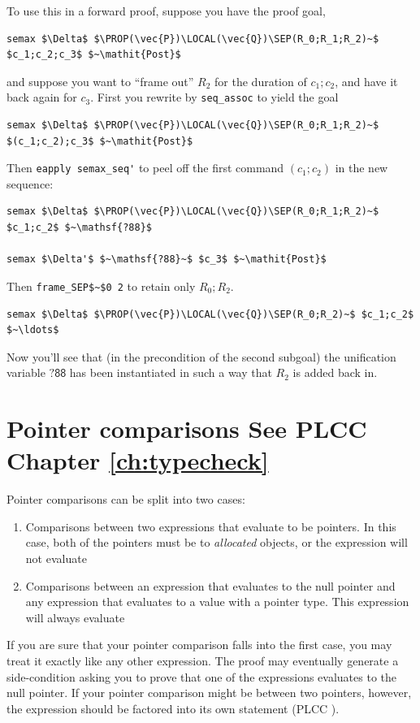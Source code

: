 \documentclass[12pt,fleqn,openany,oneside,showtrims]{memoir}
\newcommand{\ychapter}[2]{\chapter[#1]{#1 \hfill \normalsize #2}}
\begin{document}
To use this in a forward proof, suppose you have the
proof goal,
\begin{lstlisting}
semax $\Delta$ $\PROP(\vec{P})\LOCAL(\vec{Q})\SEP(R_0;R_1;R_2)~$ $c_1;c_2;c_3$ $~\mathit{Post}$
\end{lstlisting}
and suppose you want to ``frame out'' $R_2$ for the duration of 
$c_1;c_2$, and have it back again for $c_3$.
First you rewrite by \lstinline{seq_assoc}
to yield the goal
\begin{lstlisting}
semax $\Delta$ $\PROP(\vec{P})\LOCAL(\vec{Q})\SEP(R_0;R_1;R_2)~$ $(c_1;c_2);c_3$ $~\mathit{Post}$
\end{lstlisting}
Then \lstinline{eapply semax_seq'} to peel off the 
first command $(c_1;c_2)$ in the new sequence:
\begin{lstlisting}
semax $\Delta$ $\PROP(\vec{P})\LOCAL(\vec{Q})\SEP(R_0;R_1;R_2)~$ $c_1;c_2$ $~\mathsf{?88}$

semax $\Delta'$ $~\mathsf{?88}~$ $c_3$ $~\mathit{Post}$
\end{lstlisting}
Then \lstinline{frame_SEP$~$0 2} to retain only $R_0;R_2$.
\begin{lstlisting}
semax $\Delta$ $\PROP(\vec{P})\LOCAL(\vec{Q})\SEP(R_0;R_2)~$ $c_1;c_2$ $~\ldots$
\end{lstlisting}
Now you'll see that (in the precondition of the second subgoal)
the unification variable $\mathsf{?88}$ has been
instantiated in such a way that $R_2$ is added back in.

\ychapter{Pointer comparisons}{See PLCC Chapter \ref{ch:typecheck}}
\label{refcard:pointer-cmp}
Pointer comparisons can be split into two cases:
\begin{enumerate}
  \item Comparisons between two expressions that evaluate to be pointers. In
  this case, both of the pointers must be to \emph{allocated} objects, or the
  expression will not evaluate
  \item Comparisons between an expression that evaluates to the null pointer and
  any expression that evaluates to a value with a pointer type. This expression
  will always evaluate
\end{enumerate}

If you are sure that your pointer comparison falls into the first case, you may
treat it exactly like any other expression. The proof may eventually generate a
side-condition asking you to prove that one of the expressions evaluates to the
null pointer. If your pointer comparison might be between two pointers, however, 
the expression should be factored into its own statement (PLCC
). 
\end{document}
